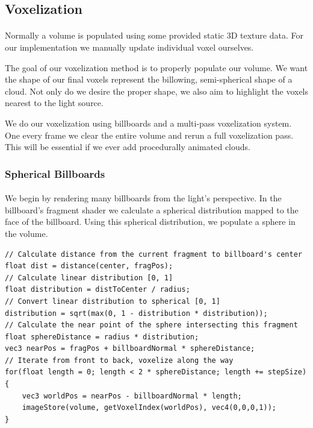 \subsection{Voxelization}\paragraph{}
Normally a volume is populated using some provided static 3D texture data.  For our implementation we manually update individual voxel ourselves. 

The goal of our voxelization method is to properly populate our volume. We want the shape of our final voxels represent the billowing, semi-spherical shape of a cloud. Not only do we desire the proper shape, we also aim to highlight the voxels nearest to the light source. 

We do our voxelization using billboards and a multi-pass voxelization system. One every frame we clear the entire volume and rerun a full voxelization pass. This will be essential if we ever add procedurally animated clouds. 

\subsubsection{Spherical Billboards}\paragraph{}
We begin by rendering many billboards from the light's perspective. In the billboard's fragment shader we calculate a spherical distribution mapped to the face of the billboard. Using this spherical distribution, we populate a sphere in the volume. 

\begin{lstlisting}[caption={first\_voxelize.glsl, 42}]
// Calculate distance from the current fragment to billboard's center
float dist = distance(center, fragPos);
// Calculate linear distribution [0, 1]
float distribution = distToCenter / radius;
// Convert linear distribution to spherical [0, 1]
distribution = sqrt(max(0, 1 - distribution * distribution));
// Calculate the near point of the sphere intersecting this fragment
float sphereDistance = radius * distribution;
vec3 nearPos = fragPos + billboardNormal * sphereDistance;
// Iterate from front to back, voxelize along the way
for(float length = 0; length < 2 * sphereDistance; length += stepSize) {
	vec3 worldPos = nearPos - billboardNormal * length;
	imageStore(volume, getVoxelIndex(worldPos), vec4(0,0,0,1));
}
\end{lstlisting}\paragraph{}

